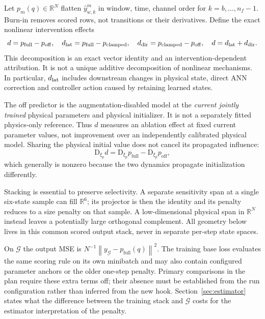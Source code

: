 \documentclass[11pt,a4paper]{article}
\newcommand{\R}{\mathbb R}
\newcommand{\D}{\mathrm D}
\newcommand{\norm}[1]{\left\lVert#1\right\rVert}
\newcommand{\full}{\mathrm{full}}
\newcommand{\off}{\mathrm{off}}
\newcommand{\clamp}{\mathrm{clamped}}
\theoremstyle{remark}
\begin{document}
Let $p_m(q)\in\R^N$ flatten $\hat y_{w,k}^m$ in window, time, channel order for $k=b,\ldots,n_f-1$. Burn-in removes scored rows, not transitions or their derivatives. Define the exact nonlinear intervention effects
\begin{equation}\label{eq:effects}
 d=p_\full-p_\off,\quad d_{\rm lat}=p_\full-p_\clamp,\quad
 d_{\rm dir}=p_\clamp-p_\off,\quad d=d_{\rm lat}+d_{\rm dir}.
\end{equation}
This decomposition is an exact vector identity and an intervention-dependent attribution. It is not a unique additive decomposition of nonlinear mechanisms. In particular, $d_{\rm lat}$ includes downstream changes in physical state, direct ANN correction and controller action caused by retaining learned states.

The off predictor is the augmentation-disabled model at the \emph{current jointly trained} physical parameters and physical initializer. It is not a separately fitted physics-only reference. Thus $d$ measures an ablation effect at fixed current parameter values, not improvement over an independently calibrated physical model. Sharing the physical initial value does not cancel its propagated influence:
\begin{equation}\label{eq:encoder-effect-dependence}
 \D_{\xi_p}d=\D_{\xi_p}p_\full-\D_{\xi_p}p_\off,
\end{equation}
which generally is nonzero because the two dynamics propagate initialization differently.

Stacking is essential to preserve selectivity. A separate sensitivity span at a single six-state sample can fill $\R^6$; its projector is then the identity and its penalty reduces to a size penalty on that sample. A low-dimensional physical span in $\R^N$ instead leaves a potentially large orthogonal complement. All geometry below lives in this common scored output stack, never in separate per-step state spaces.

On $\mathcal G$ the output MSE is $N^{-1}\norm{y_\mathcal G-p_\full(q)}^2$. The training base loss evaluates the same scoring rule on its own minibatch and may also contain configured parameter anchors or the older one-step penalty. Primary comparisons in the plan require these extra terms off; their absence must be established from the run configuration rather than inferred from the new hook. Section~\ref{sec:estimator} states what the difference between the training stack and $\mathcal G$ costs for the estimator interpretation of the penalty.
\end{document}
